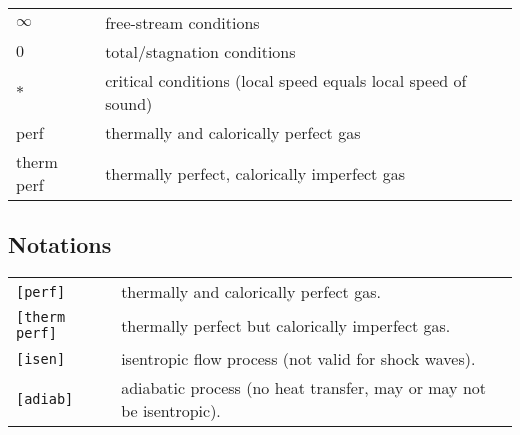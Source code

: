 \begin{flushleft}
\renewcommand{\arraystretch}{1.3}
\begin{tabular}{ll}
$\infty$ & free-stream conditions \\
$0$ & total/stagnation conditions \\
$*$ & critical conditions (local speed equals local speed of sound) \\
perf & thermally and calorically perfect gas \\
therm perf & thermally perfect, calorically imperfect gas \\
\end{tabular}
\end{flushleft}

\subsection*{Notations}

\begin{flushleft}
\renewcommand{\arraystretch}{1.3}
\begin{tabular}{ll}
    \texttt{[perf]} & thermally and calorically perfect gas. \\
    \texttt{[therm perf]} & thermally perfect but calorically imperfect gas.\\
    \texttt{[isen]} & isentropic flow process (not valid for shock waves).\\
    \texttt{[adiab]} & adiabatic process (no heat transfer, may or may not be isentropic).\\
\end{tabular}
\end{flushleft}
